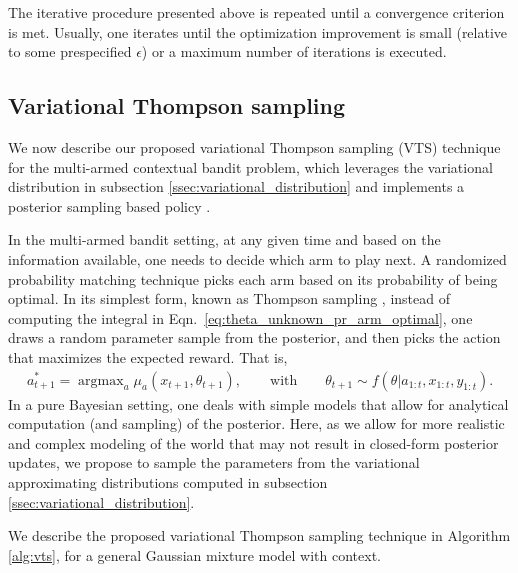 \documentclass{article}
\newcommand{\argmax}{\mathop{\mathrm{argmax}}}
\begin{document}
The iterative procedure presented  above is repeated until a convergence criterion is met. Usually, one iterates until the optimization improvement is small (relative to some prespecified $\epsilon$) or a maximum number of iterations is executed.

\subsection{Variational Thompson sampling}
\label{ssec:variational_thompson_sampling}

We now describe our proposed variational Thompson sampling (VTS) technique for the multi-armed contextual bandit problem, which leverages the variational distribution in subsection \ref{ssec:variational_distribution} and implements a posterior sampling based policy \cite{j-Russo2014}.

In the multi-armed bandit setting, at any given time and based on the information available, one needs to decide which arm to play next. A randomized probability matching technique picks each arm based on its probability of being optimal. In its simplest form, known as Thompson sampling \cite{j-Thompson1935}, instead of computing the integral in Eqn.~\eqref{eq:theta_unknown_pr_arm_optimal}, one draws a random parameter sample from the posterior, and then picks the action that maximizes the expected reward. That is, 
\begin{equation}
\begin{split}
a_{t+1}^*=\argmax_{a}\mu_{a}(x_{t+1},\theta_{t+1}), \qquad  \text{with} \qquad \theta_{t+1} \sim f(\theta|a_{1:t}, x_{1:t}, y_{1:t}) .
\end{split}
\end{equation}
In a pure Bayesian setting, one deals with simple models that allow for analytical computation (and sampling) of the posterior. Here, as we allow for more realistic and complex modeling of the world that may not result in closed-form posterior updates, we propose to sample the parameters from the variational approximating distributions computed in subsection \ref{ssec:variational_distribution}.

We describe the proposed variational Thompson sampling technique in Algorithm \ref{alg:vts}, for a general Gaussian mixture model with context.
\end{document}
